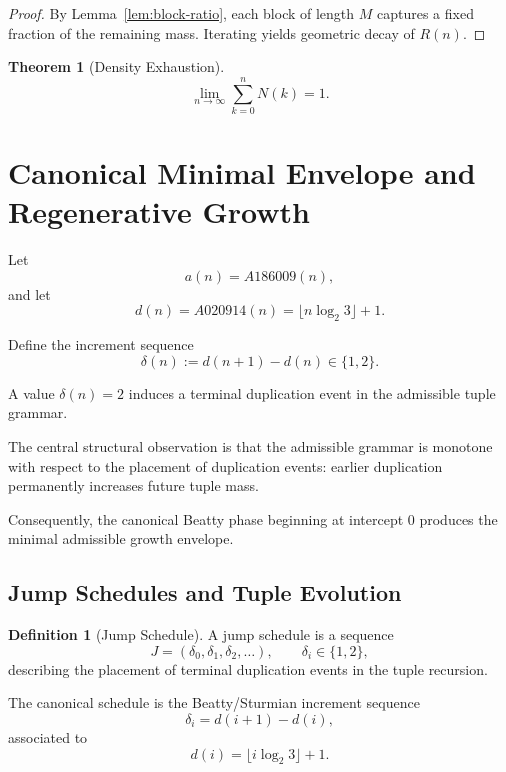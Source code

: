 \documentclass[12pt, oneside]{article}
\numberwithin{equation}{section}
\theoremstyle{definition}
\newtheorem{definition}{Definition}[section]
\theoremstyle{plain}
\newtheorem{theorem}{Theorem}[section]
\theoremstyle{remark}
\begin{document}
\begin{proof}
By Lemma~\ref{lem:block-ratio}, each block of length $M$ captures a fixed
fraction of the remaining mass. Iterating yields geometric decay of $R(n)$.
\end{proof}

\begin{theorem}[Density Exhaustion]
\label{thm:density-exhaustion-final}
\[
\lim_{n \to \infty} \sum_{k=0}^{n} N(k) = 1.
\]
\end{theorem}

\section{Canonical Minimal Envelope and Regenerative Growth}
\label{sec:minimal-envelope}

Let
\[
a(n)=A186009(n),
\]
and let
\[
d(n)=A020914(n)=\lfloor n\log_2 3\rfloor+1.
\]

Define the increment sequence
\[
\delta(n):=d(n+1)-d(n)\in\{1,2\}.
\]

A value $\delta(n)=2$ induces a terminal duplication event in the
admissible tuple grammar.

The central structural observation is that the admissible grammar is
monotone with respect to the placement of duplication events:
earlier duplication permanently increases future tuple mass.

Consequently, the canonical Beatty phase beginning at intercept $0$
produces the minimal admissible growth envelope.


\subsection{Jump Schedules and Tuple Evolution}


\begin{definition}[Jump Schedule]
A jump schedule is a sequence
\[
J=(\delta_0,\delta_1,\delta_2,\dots),
\qquad
\delta_i\in\{1,2\},
\]
describing the placement of terminal duplication events in the
tuple recursion.

The canonical schedule is the Beatty/Sturmian increment sequence
\[
\delta_i=d(i+1)-d(i),
\]
associated to
\[
d(i)=\lfloor i\log_2 3\rfloor+1.
\]
\end{definition}
\end{document}
